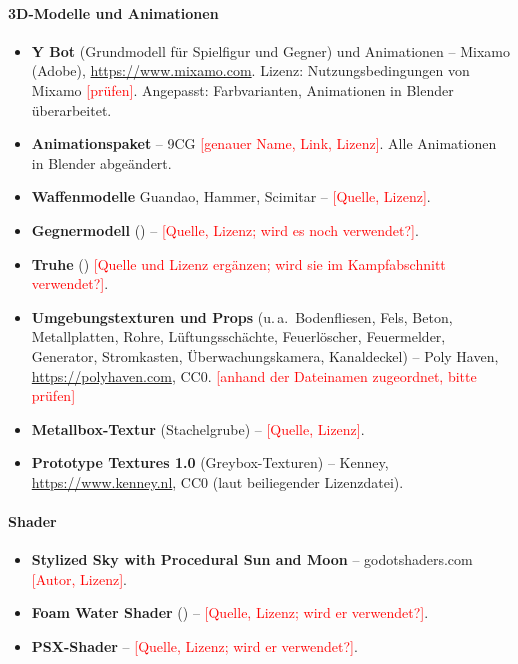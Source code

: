 \documentclass[../Main.tex]{subfiles}
\begin{document}
\paragraph{3D-Modelle und Animationen}
\begin{itemize}[leftmargin=1.5cm]
\item \textbf{Y Bot} (Grundmodell für Spielfigur und Gegner) und Animationen -- Mixamo (Adobe), \url{https://www.mixamo.com}. Lizenz: Nutzungsbedingungen von Mixamo \textcolor{red}{[prüfen]}. Angepasst: Farbvarianten, Animationen in Blender überarbeitet.
\item \textbf{Animationspaket} -- 9CG \textcolor{red}{[genauer Name, Link, Lizenz]}. Alle Animationen in Blender abgeändert.
\item \textbf{Waffenmodelle} Guandao, Hammer, Scimitar -- \textcolor{red}{[Quelle, Lizenz]}.
\item \textbf{Gegnermodell} () -- \textcolor{red}{[Quelle, Lizenz; wird es noch verwendet?]}.
\item \textbf{Truhe} () \textcolor{red}{[Quelle und Lizenz ergänzen; wird sie im Kampfabschnitt verwendet?]}.
\item \textbf{Umgebungstexturen und Props} (u.\,a.\ Bodenfliesen, Fels, Beton, Metallplatten, Rohre, Lüftungsschächte, Feuerlöscher, Feuermelder, Generator, Stromkasten, Überwachungskamera, Kanaldeckel) -- Poly Haven, \url{https://polyhaven.com}, CC0. \textcolor{red}{[anhand der Dateinamen zugeordnet, bitte prüfen]}
\item \textbf{Metallbox-Textur} (Stachelgrube) -- \textcolor{red}{[Quelle, Lizenz]}.
\item \textbf{Prototype Textures 1.0} (Greybox-Texturen) -- Kenney, \url{https://www.kenney.nl}, CC0 (laut beiliegender Lizenzdatei).
\end{itemize}

\paragraph{Shader}
\begin{itemize}[leftmargin=1.5cm]
\item \textbf{Stylized Sky with Procedural Sun and Moon} -- godotshaders.com \textcolor{red}{[Autor, Lizenz]}.
\item \textbf{Foam Water Shader} () -- \textcolor{red}{[Quelle, Lizenz; wird er verwendet?]}.
\item \textbf{PSX-Shader} -- \textcolor{red}{[Quelle, Lizenz; wird er verwendet?]}.
\end{itemize}
\end{document}
